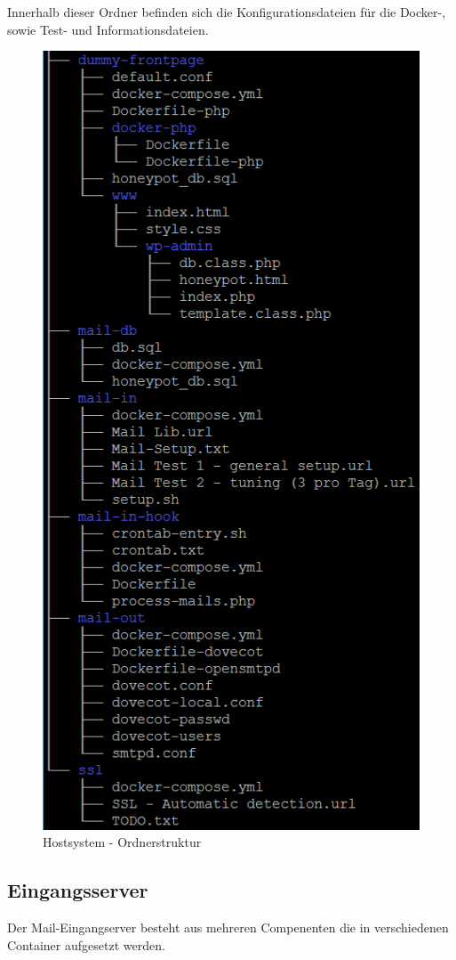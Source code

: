 \documentclass[a4paper,11pt,singlespacing]{article}
\begin{document}
			Innerhalb dieser Ordner befinden sich die Konfigurationsdateien für die Docker-, sowie Test- und Informationsdateien.
	\begin{figure}[H]
		\centering
		\includegraphics[scale=0.9]{hostTree.png}
	 	\caption{Hostsystem - Ordnerstruktur}
		\label{fig:HostsystemOrdnerstruktur}
	\end{figure}	
	
	\subsection{Eingangsserver}\label{sec:UmsetzungEingangsserver}
		Der Mail-Eingangserver besteht aus mehreren Compenenten die in verschiedenen Container aufgesetzt werden.
\end{document}
